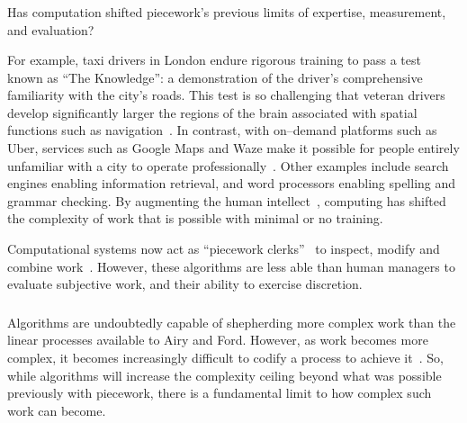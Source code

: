 \documentclass[trackingWork]{subfiles}
\begin{document}
\subsubsection{\whatchanged}
\begin{comment}
  mangeerial overhead limits, so what's different
  more people can now do complex work without training (more complex)
  parts of management can be automated (more firms)
  cheaper to create the infrastructure (more complex)
\end{comment}

Has computation shifted piecework's previous limits of
expertise, measurement, and evaluation?

For example, taxi drivers in London endure rigorous training to pass a test known as ``The Knowledge'': a demonstration of the driver's comprehensive familiarity with the city's roads.
This test is so challenging that veteran drivers develop significantly larger
the regions of the brain associated with spatial functions such as navigation~\cite{Maguire11042000,Maguire2894,Skok:1999:KML:299513.299625,skok2000managing,Woollett1407,woollett2011acquiring}.
In contrast, with on--demand platforms such as Uber, services such as Google Maps and Waze make it possible for
people entirely unfamiliar with a city
to operate professionally~\cite{silva2013traffic,hind2014outsmarting}.
Other examples include search engines enabling information retrieval, and
word processors enabling spelling and grammar checking.
By augmenting the human intellect~\cite{engelbart2001augmenting},
computing has shifted the complexity of work that is possible with minimal or no training.

Computational systems now act as ``piecework clerks''~\cite{10.2307/23702539} to
inspect,
modify and
combine work~\cite{turkopticon,takingAHITMcInnis}.
However, these algorithms are less able than human managers to evaluate subjective work, and
their ability to exercise discretion.

\subsubsection{\implication}
Algorithms are undoubtedly capable of shepherding more complex work than the linear processes available to Airy and Ford.
However, as work becomes more complex,
it becomes increasingly difficult to codify a process to achieve it~\cite{Faraj2006a,edmondson2012teaming}.
So, while algorithms will increase the complexity ceiling beyond what was possible previously with piecework, there is a fundamental limit to how complex such work can become.
\end{document}
